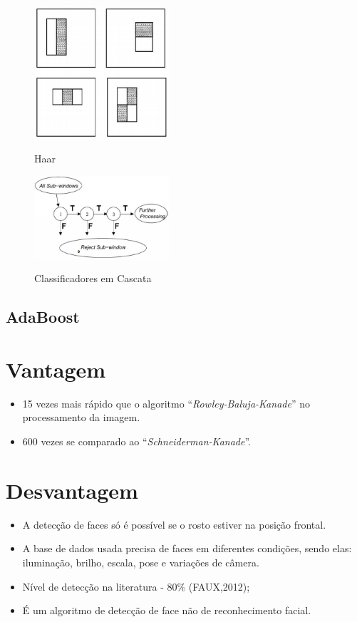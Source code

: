 \documentclass[12pt,a4paper]{article}
\begin{document}
\begin{figure}[h!]
\centering
\includegraphics[width=5cm]{recursos/imagens/Haar.png}
\label{2}
\caption{Haar}
\end{figure} 

\begin{figure}[h!]
\centering
\includegraphics[width=5cm]{recursos/imagens/cascata.png}
\label{3}
\caption{Classificadores em Cascata}
\end{figure} 



\subsection{AdaBoost}







\section{Vantagem}
\begin{itemize}
	\item 15 vezes mais rápido que o algoritmo “\textit{Rowley-Baluja-Kanade}” no processamento da imagem.

	\item 600 vezes se comparado ao “\textit{Schneiderman-Kanade}”.
\end{itemize}

\section{Desvantagem}
\begin{itemize}
	\item A detecção de faces só é possível se o rosto estiver na posição frontal.
	\item A base de dados usada precisa de faces em diferentes condições, sendo elas: iluminação, brilho, escala, pose e variações de câmera.
	\item Nível de detecção na literatura - 80\% (FAUX,2012);
	\item É um algoritmo de detecção de face não de reconhecimento facial.
\end{itemize}
\end{document}
